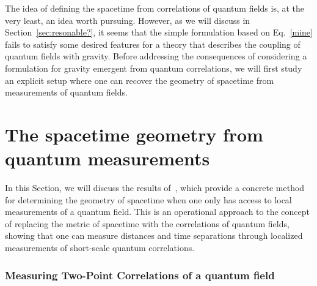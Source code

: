 \documentclass[letterpaper,12pt,titlepage,oneside,final]{book}
\newcommand{\trr}[1]{\textcolor{red}{#1}}
\begin{document}
The idea of defining the spacetime from correlations of quantum fields is, at the very least, an idea worth pursuing. However, as we will discuss in Section~\ref{sec:resonable?}, it seems that the simple formulation based on Eq.~\eqref{mine} fails to satisfy some desired features for a theory that describes the coupling of quantum fields with gravity. Before addressing the consequences of considering a formulation for gravity emergent from quantum correlations, we will first study an explicit setup where one can recover the geometry of spacetime from measurements of quantum fields. 









\section{The spacetime geometry from quantum measurements}\label{sec:geometryFromMeas}

In this Section, we will discuss the results of~\cite{geometry}, which provide a concrete method for determining the geometry of spacetime when one only has access to local measurements of a quantum field. This is an operational approach to the concept of replacing the metric of spacetime with the correlations of quantum fields, showing that one can measure distances and time separations through localized measurements of short-scale quantum correlations.

\subsubsection*{Measuring Two-Point Correlations of a quantum field}
\end{document}
